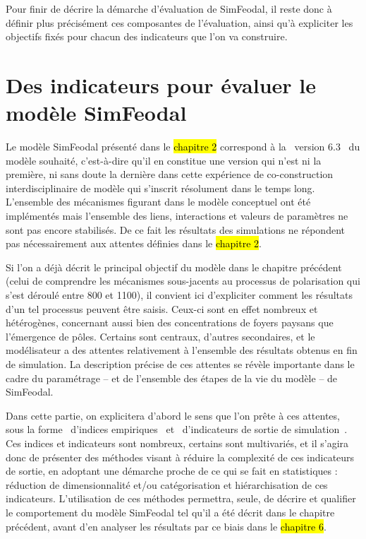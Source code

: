 Pour finir de décrire la démarche d'évaluation de SimFeodal, il reste donc à définir plus précisément ces composantes de l'évaluation, ainsi qu'à expliciter les objectifs fixés pour chacun des indicateurs que l'on va construire.


\section[Des indicateurs pour SimFeodal]{Des indicateurs pour évaluer le modèle SimFeodal}

Le modèle SimFeodal présenté dans le \hl{chapitre 2} correspond à la \og version 6.3 \fg{} du modèle souhaité, c'est-à-dire qu'il en constitue une version qui n'est ni la première, ni sans doute la dernière dans cette expérience de co-construction interdisciplinaire de modèle qui s'inscrit résolument dans le temps long.
L'ensemble des mécanismes figurant dans le modèle conceptuel ont été implémentés mais l'ensemble des liens, interactions et valeurs de paramètres ne sont pas encore stabilisés.
De ce fait les résultats des simulations ne répondent pas nécessairement aux attentes définies dans le \hl{chapitre 2}.

Si l'on a déjà décrit le principal objectif du modèle dans le chapitre précédent (celui de comprendre les mécanismes sous-jacents au processus de polarisation qui s'est déroulé entre 800 et 1100), il convient ici d'expliciter comment les résultats d'un tel processus peuvent être saisis.
Ceux-ci sont en effet nombreux et hétérogènes, concernant aussi bien des concentrations de foyers paysans que l'émergence de pôles.
Certains sont centraux, d'autres secondaires, et le modélisateur a des attentes relativement à l'ensemble des résultats obtenus en fin de simulation.
La description précise de ces attentes se révèle importante dans le cadre du paramétrage -- et de l'ensemble des étapes de la vie du modèle -- de SimFeodal.

Dans cette partie, on explicitera d'abord le sens que l'on prête à ces attentes, sous la forme \og d'indices empiriques \fg{} et \og d'indicateurs de sortie de simulation \fg{}.
Ces indices et indicateurs sont nombreux, certains sont multivariés, et il s'agira donc de présenter des méthodes visant à réduire la complexité de ces indicateurs de sortie, en adoptant une démarche proche de ce qui se fait en statistiques : réduction de dimensionnalité et/ou catégorisation et hiérarchisation de ces indicateurs.
L'utilisation de ces méthodes permettra, seule, de décrire et qualifier le comportement du modèle SimFeodal tel qu'il a été décrit dans le chapitre précédent, avant d'en analyser les résultats par ce biais dans le \hl{chapitre 6}.

